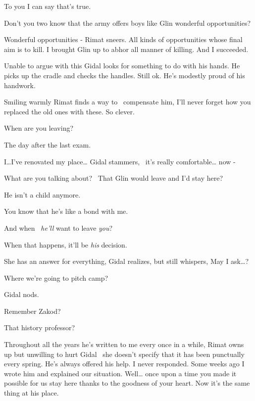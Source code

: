 \documentclass[12pt]{book}
\begin{document}
{\textquotedbl}To you I can say that's true.{\textquotedbl}

{\textquotedbl}Don't you two know that the army offers boys like Glin wonderful opportunities?{\textquotedbl}

{\textquotedbl}Wonderful opportunities -{\textquotedbl} Rimat sneers. {\textquotedbl}All kinds of opportunities whose
final aim is to kill. I brought Glin up to abhor all manner of killing. And I succeeded.{\textquotedbl}

Unable to argue with this Gidal looks for something to do with his hands. He picks up the cradle and checks the handles.
Still ok. He's modestly proud of his handwork.

Smiling warmly Rimat finds a way to \ compensate him, {\textquotedbl}I'll never forget how you replaced the old ones
with these. So clever.{\textquotedbl}

{\textquotedbl}When are you leaving?{\textquotedbl}

{\textquotedbl}The day after the last exam.{\textquotedbl}

{\textquotedbl}I{\dots}I've renovated my place{\dots}{\textquotedbl} Gidal stammers,~{\textquotedbl} it's really
comfortable{\dots} now - {\textquotedbl}

{\textquotedbl}What are you talking about? \ That Glin would leave and I'd stay here?{\textquotedbl}

{\textquotedbl}He isn't a child anymore.{\textquotedbl}

{\textquotedbl}You know that he's like a bond{ }with me.{\textquotedbl}

{\textquotedbl}And when {\ }\textit{he'll} want to leave \textit{you}?{\textquotedbl}

{\textquotedbl}When that happens, it'll be \textit{his} decision.{\textquotedbl}

She has an answer for everything, Gidal realizes, but still whispers, {\textquotedbl}May I ask{\dots}?{\textquotedbl}

{\textquotedbl}Where we're going to pitch camp?{\textquotedbl}

Gidal nods.

{\textquotedbl}Remember Zakod?{\textquotedbl}

{\textquotedbl}That history professor?{\textquotedbl}

{\textquotedbl}Throughout all the years he's written to me every once in a while,{\textquotedbl} Rimat owns up but
unwilling to hurt Gidal \ she doesn't specify that it has been{
}{punctually}{ }every spring. {\textquotedbl}He's always offered his help. I never
responded. Some weeks ago I wrote him and explained our situation. Well{\dots} once upon a time you made it possible
for us stay here thanks to{ }the goodness of your heart. Now it's the same thing at his
place.{\textquotedbl}
\end{document}
